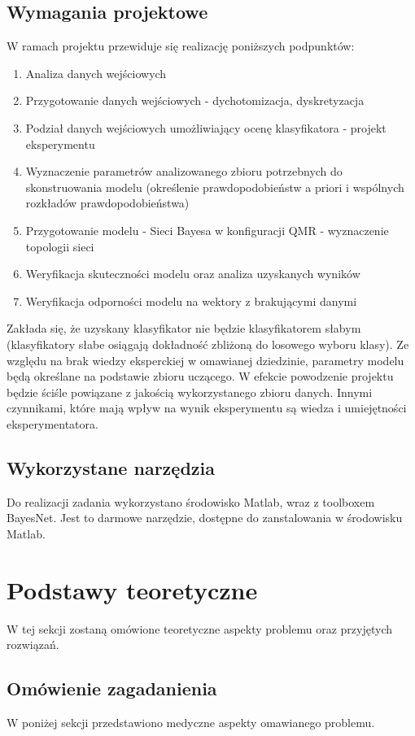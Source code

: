 \documentclass{article}
\begin{document}
\subsection{Wymagania projektowe}
W ramach projektu przewiduje się realizację poniższych podpunktów:
\begin{enumerate}
	\item Analiza danych wejściowych
	\item Przygotowanie danych wejściowych - dychotomizacja, dyskretyzacja
	\item Podział danych wejściowych umożliwiający ocenę klasyfikatora - projekt eksperymentu
	\item Wyznaczenie parametrów analizowanego zbioru potrzebnych do skonstruowania modelu (określenie prawdopodobieństw a priori i wspólnych rozkładów prawdopodobieństwa)
	\item Przygotowanie modelu - Sieci Bayesa w konfiguracji QMR - wyznaczenie topologii sieci
	\item Weryfikacja skuteczności modelu oraz analiza uzyskanych wyników
	\item Weryfikacja odporności modelu na wektory z brakującymi danymi
\end{enumerate}

Zakłada się, że uzyskany klasyfikator nie będzie klasyfikatorem słabym (klasyfikatory słabe osiągają dokładność zbliżoną do losowego wyboru klasy). Ze względu na brak wiedzy eksperckiej w omawianej dziedzinie, parametry modelu będą określane na podstawie zbioru uczącego. W efekcie powodzenie projektu będzie ściśle powiązane z jakością wykorzystanego zbioru danych. Innymi czynnikami, które mają wpływ na wynik eksperymentu są wiedza i umiejętności eksperymentatora.

\subsection{Wykorzystane narzędzia}
Do realizacji zadania wykorzystano środowisko Matlab, wraz z toolboxem BayesNet. Jest to darmowe narzędzie, dostępne do zanstalowania w środowisku Matlab. 

\section{Podstawy teoretyczne}
W tej sekcji zostaną omówione teoretyczne aspekty problemu oraz przyjętych rozwiązań.

\subsection{Omówienie zagadanienia}
W poniżej sekcji przedstawiono medyczne aspekty omawianego problemu.
\end{document}
